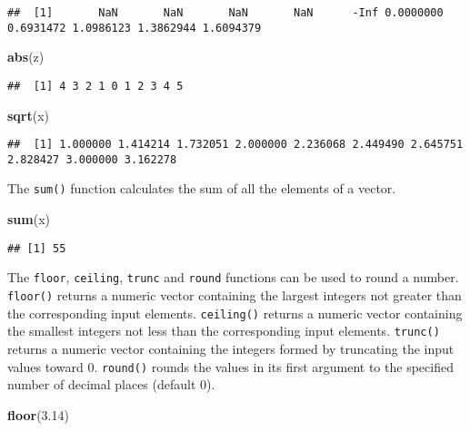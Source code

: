 \documentclass[]{book}
\newenvironment{Shaded}{\begin{snugshade}}{\end{snugshade}}
\newcommand{\KeywordTok}[1]{\textcolor[rgb]{0.13,0.29,0.53}{\textbf{{#1}}}}
\newcommand{\FloatTok}[1]{\textcolor[rgb]{0.00,0.00,0.81}{{#1}}}
\newcommand{\NormalTok}[1]{{#1}}
\begin{document}
\begin{verbatim}
##  [1]       NaN       NaN       NaN       NaN      -Inf 0.0000000 0.6931472 1.0986123 1.3862944 1.6094379
\end{verbatim}

\begin{Shaded}
\begin{Highlighting}[]
\KeywordTok{abs}\NormalTok{(z)}
\end{Highlighting}
\end{Shaded}

\begin{verbatim}
##  [1] 4 3 2 1 0 1 2 3 4 5
\end{verbatim}

\begin{Shaded}
\begin{Highlighting}[]
\KeywordTok{sqrt}\NormalTok{(x)}
\end{Highlighting}
\end{Shaded}

\begin{verbatim}
##  [1] 1.000000 1.414214 1.732051 2.000000 2.236068 2.449490 2.645751 2.828427 3.000000 3.162278
\end{verbatim}

The \texttt{sum()} function calculates the sum of all the elements of a
vector.

\begin{Shaded}
\begin{Highlighting}[]
\KeywordTok{sum}\NormalTok{(x)}
\end{Highlighting}
\end{Shaded}

\begin{verbatim}
## [1] 55
\end{verbatim}

The \texttt{floor}, \texttt{ceiling}, \texttt{trunc} and \texttt{round}
functions can be used to round a number. \texttt{floor()} returns a
numeric vector containing the largest integers not greater than the
corresponding input elements. \texttt{ceiling()} returns a numeric
vector containing the smallest integers not less than the corresponding
input elements. \texttt{trunc()} returns a numeric vector containing the
integers formed by truncating the input values toward 0.
\texttt{round()} rounds the values in its first argument to the
specified number of decimal places (default 0).

\begin{Shaded}
\begin{Highlighting}[]
\KeywordTok{floor}\NormalTok{(}\FloatTok{3.14}\NormalTok{)}
\end{Highlighting}
\end{Shaded}
\end{document}
